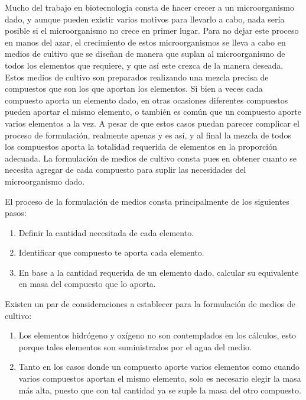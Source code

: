 Mucho del trabajo en biotecnología consta de hacer crecer a un microorganismo dado, y aunque pueden existir varios motivos para llevarlo a cabo, nada sería posible si el microorganismo no crece en primer lugar. Para no dejar este proceso en manos del azar, el crecimiento de estos microorganismos se lleva a cabo en medios de cultivo que se diseñan de manera que suplan al microorganismo de todos los elementos que requiere, y que así este crezca de la manera deseada. Estos medios de cultivo son preparados realizando una mezcla precisa de compuestos que son los que aportan los elementos. Si bien a veces cada compuesto aporta un elemento dado, en otras ocasiones diferentes compuestos pueden aportar el mismo elemento, o también es común que un compuesto aporte varios elementos a la vez. A pesar de que estos casos puedan parecer complicar el proceso de formulación, realmente apenas y es así, y al final la mezcla de todos los compuestos aporta la totalidad requerida de elementos en la proporción adecuada. La formulación de medios de cultivo consta pues en obtener cuanto se necesita agregar de cada compuesto para suplir las necesidades del microorganismo dado.

El proceso de la formulación de medios consta principalmente de los siguientes pasos:

\begin{enumerate}
    \item Definir la cantidad necesitada de cada elemento.
    \item Identificar que compuesto te aporta cada elemento.
    \item En base a la cantidad requerida de un elemento dado, calcular su equivalente en masa del compuesto que lo aporta.
\end{enumerate}

Existen un par de consideraciones a establecer para la formulación de medios de cultivo:

\begin{enumerate}
    \item Los elementos hidrógeno y oxígeno no son contemplados en los cálculos, esto porque tales elementos son suministrados por el agua del medio.
    \item Tanto en los casos donde un compuesto aporte varios elementos como cuando varios compuestos aportan el mismo elemento, solo es necesario elegir la masa más alta, puesto que con tal cantidad ya se suple la masa del otro compuesto.    
\end{enumerate}

